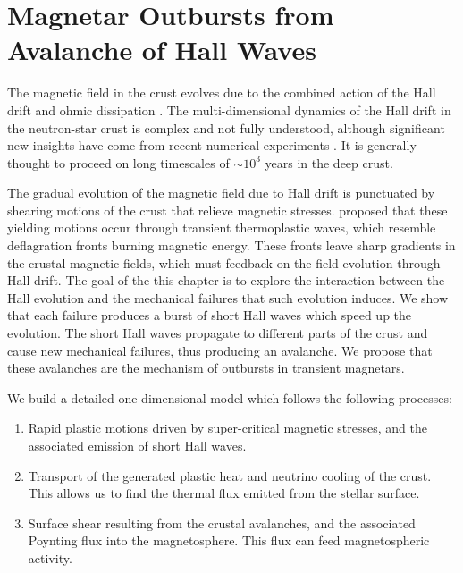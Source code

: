 \def\T{{\mathcal T}}
\def\scr{s_{\rm cr}}
\def\Ts{T_{\rm s}}
\def\Tm{T_{\rm melt}}
\def\zmelt{z_{\rm melt}}
\def\beq{\begin{equation}}
\def\eeq{\end{equation}}
\def\sel{s_{\rm el}}
\def\spl{s_{\rm pl}}
\def\dspl{\dot{s}_{\rm pl}}
\def\sigcr{\sigma_{\rm cr}}
\def\Um{U_{\rm melt}}
\def\Uth{U_{\rm th}}
\def\Eq{Equation}
\def\Eqs{Equations}
\def\Ekin{E_{\rm kin}}
\def\Emag{E_{\rm mag}}
\def\Eel{E_{\rm el}}
\def\zd{z_{\rm damp}}
\def\Eaft{E_{\rm aft}}
\def\tc{t_{\rm cond}}
\def\LL{L}
\def\lw{l}
\def\Lum{\mathscr L}
\def\sigcr{\sigma_{\rm cr}}
\def\Bcr{B_{\rm cr}}

\chapter[Magnetar Outbursts from Avalanche of Hall Waves]{Magnetar Outbursts from Avalanche of Hall Waves}
\label{chap:hall}
The magnetic field in the crust evolves due to the combined action of the Hall drift and ohmic dissipation \citep{1992ApJ...395..250G, 2004MNRAS.347.1273H,2013MNRAS.434..123V}. 
The multi-dimensional dynamics of the Hall drift in the neutron-star crust is complex and not fully understood, although significant new insights have come from recent numerical experiments \citep{2012MNRAS.421.2722K, 2013MNRAS.434.2480G,2014MNRAS.438.1618G,2015MNRAS.446.1121G, 2015PhRvL.114s1101W}. It is generally thought to proceed on long timescales of $\sim 10^3$ years in the deep crust.

The gradual evolution of the magnetic field due to Hall drift is punctuated by shearing motions of the crust that relieve magnetic stresses. 
\citet{2014ApJ...794L..24B} proposed that these yielding motions occur through transient thermoplastic waves, which resemble deflagration fronts burning magnetic energy. 
These fronts leave sharp gradients in the crustal magnetic fields, which must feedback on the field evolution through Hall drift.
The goal of the this chapter is to explore the interaction between the Hall evolution and the mechanical failures that such evolution induces. 
We show that each failure produces a burst of short Hall waves which speed up the evolution. 
The short Hall waves propagate to different parts of the crust and cause new mechanical failures, thus producing an avalanche. 
We propose that these avalanches are the mechanism of outbursts in transient magnetars.
 
We build a detailed one-dimensional model which follows the following processes:
\begin{enumerate}
	\item Rapid plastic motions driven by super-critical magnetic stresses,
and the associated emission of short Hall waves.
	\item Transport of the generated plastic heat and neutrino cooling of the crust. This allows us to find the thermal flux emitted from the stellar surface.
	\item Surface shear resulting from the crustal avalanches, and the associated Poynting flux into the magnetosphere. This flux can feed magnetospheric activity.

\end{enumerate} 

